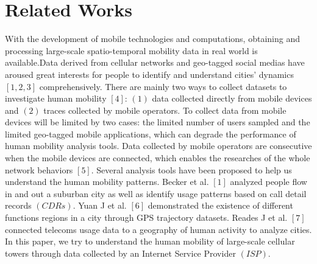\section{Related Works}
With the development of mobile technologies and computations, obtaining and processing large-scale spatio-temporal mobility data in real world is available.Data derived from cellular networks and geo-tagged social medias have aroused great interests for people to identify and understand cities' dynamics $[1,2,3]$ comprehensively. There are mainly two ways to collect datasets to investigate human mobility $[4]$: $(1)$ data collected directly from mobile devices and $(2)$ traces collected by mobile operators. To collect data from mobile devices will be limited by two cases: the limited number of users sampled and the limited geo-tagged mobile applications, which can degrade the performance of human mobility analysis tools. Data collected by mobile operators are consecutive when the mobile devices are connected, which enables the researches of the whole network behaviors $[5]$. Several analysis tools have been proposed to help us understand the human mobility patterns. Becker et al. $[1]$ analyzed people flow in and out a suburban city as well as identify usage patterns based on call detail records
$(CDRs)$. Yuan J et al. $[6]$ demonstrated the existence of different functions regions in a city through GPS trajectory datasets. Reades J et al. $[7]$ connected telecoms usage data to a geography of human activity to analyze cities. In this paper, we try to understand the human mobility of large-scale cellular towers through data collected by an Internet Service Provider $(ISP)$.

